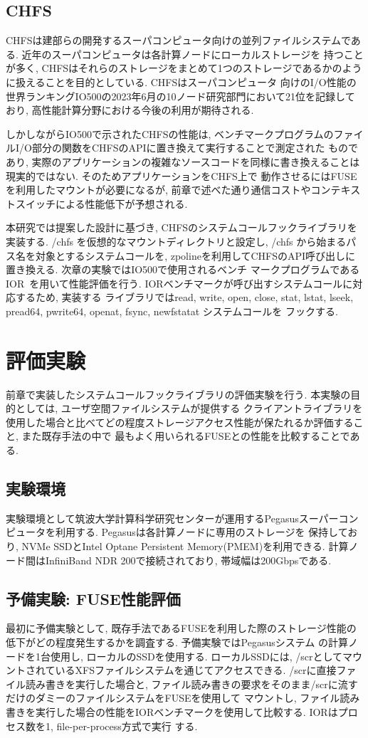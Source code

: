 \documentclass[a4paper,11pt]{jreport}
\begin{document}
\section{CHFS}
CHFSは建部らの開発するスーパコンピュータ向けの並列ファイルシステムである. 近年のスーパコンピュータは各計算ノードにローカルストレージを
持つことが多く, CHFSはそれらのストレージをまとめて1つのストレージであるかのように扱えることを目的としている. CHFSはスーパコンピュータ
向けのI/O性能の世界ランキングIO500の2023年6月の10ノード研究部門において21位を記録しており, 高性能計算分野における今後の利用が期待される.

しかしながらIO500で示されたCHFSの性能は, ベンチマークプログラムのファイルI/O部分の関数をCHFSのAPIに置き換えて実行することで測定された
ものであり, 実際のアプリケーションの複雑なソースコードを同様に書き換えることは現実的ではない. そのためアプリケーションをCHFS上で
動作させるにはFUSEを利用したマウントが必要になるが, 前章で述べた通り通信コストやコンテキストスイッチによる性能低下が予想される.

本研究では提案した設計に基づき, CHFSのシステムコールフックライブラリを実装する. /chfs を仮想的なマウントディレクトリと設定し, /chfs
から始まるパス名を対象とするシステムコールを, zpolineを利用してCHFSのAPI呼び出しに置き換える. 次章の実験ではIO500で使用されるベンチ
マークプログラムであるIOR~\cite{ior}を用いて性能評価を行う. IORベンチマークが呼び出すシステムコールに対応するため, 実装する
ライブラリではread, write, open, close, stat, lstat, lseek, pread64, pwrite64, openat, fsync, newfstatat システムコールを
フックする.

\chapter{評価実験}
前章で実装したシステムコールフックライブラリの評価実験を行う. 本実験の目的としては, ユーザ空間ファイルシステムが提供する
クライアントライブラリを使用した場合と比べてどの程度ストレージアクセス性能が保たれるか評価すること, また既存手法の中で
最もよく用いられるFUSEとの性能を比較することである. 

\section{実験環境}
実験環境として筑波大学計算科学研究センターが運用するPegasusスーパーコンピュータを利用する. Pegasusは各計算ノードに専用のストレージを
保持しており, NVMe SSDとIntel Optane Persistent Memory(PMEM)を利用できる.  計算ノード間はInfiniBand NDR 200で接続されており, 
帯域幅は200Gbpsである. 
\section{予備実験: FUSE性能評価}
最初に予備実験として, 既存手法であるFUSEを利用した際のストレージ性能の低下がどの程度発生するかを調査する. 予備実験ではPegasusシステム
の計算ノードを1台使用し, ローカルのSSDを使用する. ローカルSSDには, /scrとしてマウントされているXFSファイルシステムを通じてアクセスできる.
/scrに直接ファイル読み書きを実行した場合と, ファイル読み書きの要求をそのまま/scrに流すだけのダミーのファイルシステムをFUSEを使用して
マウントし, ファイル読み書きを実行した場合の性能をIORベンチマークを使用して比較する. IORはプロセス数を1, file-per-process方式で実行
する. 
\end{document}
